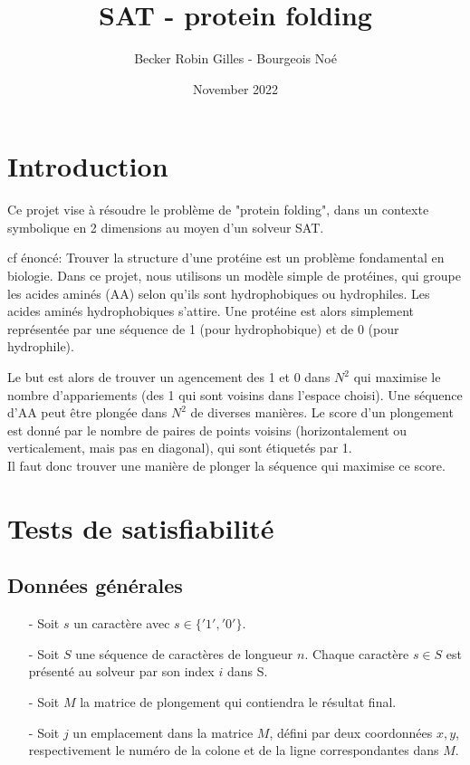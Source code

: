 \documentclass[utf8]{article}
\title{SAT - protein folding}
\author{Becker Robin Gilles - Bourgeois Noé}
\date{November 2022}
\begin{document}
\maketitle
\tableofcontents

\newpage


\section{Introduction}

Ce projet vise à résoudre le problème de "protein folding", dans un contexte symbolique en 2 dimensions au moyen d'un solveur SAT.

cf énoncé: Trouver la structure d’une protéine est un problème fondamental en biologie.
Dans ce projet, nous utilisons un modèle simple de protéines, qui groupe les
acides aminés (AA) selon qu’ils sont hydrophobiques ou hydrophiles. Les acides aminés hydrophobiques s’attire. Une protéine
est alors simplement représentée par une séquence de 1 (pour hydrophobique)
et de 0 (pour hydrophile).

Le but est alors de trouver un agencement des 1 et
0 dans $N^2$ qui maximise le nombre d’appariements (des 1 qui sont voisins dans
l’espace choisi).
Une séquence d’AA peut être plongée dans $N^2$ de diverses manières.
Le score d’un plongement est donné par le nombre de paires de points voisins
(horizontalement ou verticalement, mais pas en diagonal), qui sont étiquetés par
1.\\
Il faut donc trouver une manière de plonger la séquence qui maximise ce score.



\section{Tests de satisfiabilité}

\subsection{Données générales}
\begin{itemize}
\item[-] Soit $s$ un caractère avec $s \in \{'1', '0'\}$.
\item[-] Soit $S$ une séquence de caractères  de longueur $n$. Chaque caractère $s \in S$ est présenté au solveur par son index $i$ dans S.
\item[-] Soit $M$ la matrice de plongement qui contiendra le résultat final.
\item[-] Soit $j$ un emplacement dans la matrice $M$, défini par deux coordonnées $x , y$, respectivement le numéro de la colone et de la ligne correspondantes dans $M$.
\end{itemize}
\end{document}
